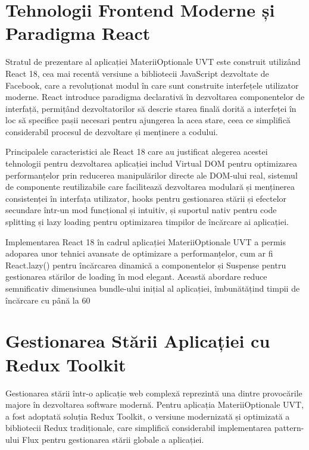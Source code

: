 \documentclass[12pt,a4paper]{report}
\begin{document}
\section{Tehnologii Frontend Moderne și Paradigma React}

Stratul de prezentare al aplicației MateriiOptionale UVT este construit utilizând React 18, cea mai recentă versiune a bibliotecii JavaScript dezvoltate de Facebook, care a revoluționat modul în care sunt construite interfețele utilizator moderne. React introduce paradigma declarativă în dezvoltarea componentelor de interfață, permițând dezvoltatorilor să descrie starea finală dorită a interfeței în loc să specifice pașii necesari pentru ajungerea la acea stare, ceea ce simplifică considerabil procesul de dezvoltare și menținere a codului.

Principalele caracteristici ale React 18 care au justificat alegerea acestei tehnologii pentru dezvoltarea aplicației includ Virtual DOM pentru optimizarea performanțelor prin reducerea manipulărilor directe ale DOM-ului real, sistemul de componente reutilizabile care facilitează dezvoltarea modulară și menținerea consistenței în interfața utilizator, hooks pentru gestionarea stării și efectelor secundare într-un mod funcțional și intuitiv, și suportul nativ pentru code splitting și lazy loading pentru optimizarea timpilor de încărcare ai aplicației.

Implementarea React 18 în cadrul aplicației MateriiOptionale UVT a permis adoparea unor tehnici avansate de optimizare a performanțelor, cum ar fi React.lazy() pentru încărcarea dinamică a componentelor și Suspense pentru gestionarea stărilor de loading în mod elegant. Această abordare reduce semnificativ dimensiunea bundle-ului inițial al aplicației, îmbunătățind timpii de încărcare cu până la 60%

\section{Gestionarea Stării Aplicației cu Redux Toolkit}

Gestionarea stării într-o aplicație web complexă reprezintă una dintre provocările majore în dezvoltarea software modernă. Pentru aplicația MateriiOptionale UVT, a fost adoptată soluția Redux Toolkit, o versiune modernizată și optimizată a bibliotecii Redux tradiționale, care simplifică considerabil implementarea pattern-ului Flux pentru gestionarea stării globale a aplicației.
\end{document}
